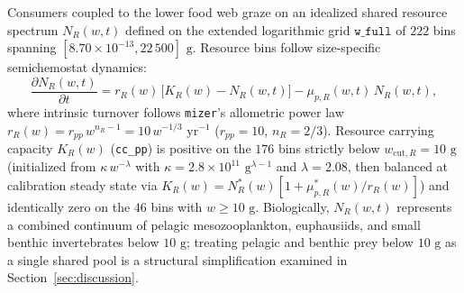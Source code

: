 \documentclass[11pt,letterpaper]{article}
\begin{document}
Consumers coupled to the lower food web graze on an idealized shared resource spectrum $N_R(w,t)$ defined on the extended logarithmic grid $\texttt{w\_full}$ of $222$ bins spanning $[8.70 \times 10^{-13}, 22\,500]\text{ g}$. Resource bins follow size-specific semichemostat dynamics:
\begin{equation}
  \frac{\partial N_R(w,t)}{\partial t} = r_R(w)\,\big[K_R(w) - N_R(w,t)\big] - \mu_{p,R}(w,t)\,N_R(w,t),
  \label{eq:resource}
\end{equation}
where intrinsic turnover follows \texttt{mizer}'s allometric power law $r_R(w) = r_{pp}\, w^{n_R - 1} = 10\, w^{-1/3}\text{ yr}^{-1}$ ($r_{pp} = 10$, $n_R = 2/3$). Resource carrying capacity $K_R(w)$ (\texttt{cc\_pp}) is positive on the $176$ bins strictly below $w_{\mathrm{cut},R} = 10\text{ g}$ (initialized from $\kappa\, w^{-\lambda}$ with $\kappa = 2.8 \times 10^{11}\text{ g}^{\lambda-1}$ and $\lambda = 2.08$, then balanced at calibration steady state via $K_R(w) = N_R^*(w)[1 + \mu_{p,R}^*(w)/r_R(w)]$) and identically zero on the $46$ bins with $w \ge 10\text{ g}$. Biologically, $N_R(w,t)$ represents a combined continuum of pelagic mesozooplankton, euphausiids, and small benthic invertebrates below $10\text{ g}$; treating pelagic and benthic prey below $10\text{ g}$ as a single shared pool is a structural simplification examined in Section~\ref{sec:discussion}.
\end{document}
